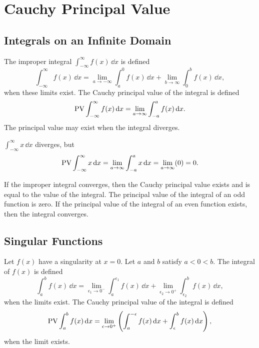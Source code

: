 \section{Cauchy Principal Value}

\subsection{Integrals on an Infinite Domain}
The improper integral $\int_{-\infty}^\infty f(x)\,\dd x$ is defined
\[ \int_{-\infty}^\infty f(x)\,\dd x = \lim_{a \to -\infty} \int_{a}^0 f(x)\,\dd x
+ \lim_{b \to \infty} \int_0^b f(x)\,\dd x,\]
when these limits exist.  The Cauchy principal value of the integral is
defined
\[ \mathop{\mathrm{PV}}\nolimits \int_{-\infty}^\infty f(x)\,\mathrm{d} x = \lim_{a \to \infty} \int_{-a}^a f(x)\,\mathrm{d} x.\]
The principal value may exist when the integral diverges.


\begin{Example}
  $\int_{-\infty}^\infty x\,\dd x$ diverges, but
  \[ \mathop{\mathrm{PV}}\nolimits \int_{-\infty}^\infty x\,\mathrm{d} x = \lim_{a \to \infty} \int_{-a}^a x\,\mathrm{d} x
  = \lim_{a \to \infty} (0) = 0. \]
\end{Example}


If the improper integral converges, then the Cauchy principal value exists
and is equal to the value of the integral.  The principal value of the
integral of an odd function is zero.  If the principal value of the integral
of an even function exists, then the integral converges.


\subsection{Singular Functions}
Let $f(x)$ have a singularity at $x = 0$. Let $a$ and $b$ satisfy
$a < 0 < b$.  The integral of $f(x)$ is defined
\[ \int_a^b f(x)\,\dd x = \lim_{\epsilon_1 \to 0^-} \int_a^{\epsilon_1} f(x)\,\dd x
+ \lim_{\epsilon_2 \to 0^+} \int_{\epsilon_2}^b f(x)\,\dd x,\]
when the limits exist.  The Cauchy principal value of the integral is defined
\[\mathop{\mathrm{PV}}\nolimits \int_a^b f(x)\,\mathrm{d} x = \lim_{\epsilon \to 0^+} \left( \int_a^{-\epsilon}
  f(x)\,\mathrm{d} x + \int_\epsilon^b f(x)\,\mathrm{d} x \right),\]
when the limit exists.


